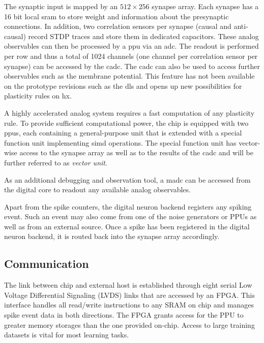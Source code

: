 The synaptic input is mapped by an $512 \times 256$ synapse array. Each synapse has a 16 bit local \gls{sram} to store weight and information about the presynaptic connections. In addition, two correlation sensors per synapse (causal and anti-causal) record STDP traces and store them in dedicated capacitors. These analog observables can then be processed by a \gls{ppu} via an \gls{adc}. The readout is performed per row and thus a total of 1024 channels (one channel per correlation sensor per synapse) can be accessed by the \gls{cadc}. The \gls{cadc} can also be used to access further observables such as the membrane potential. This feature has not been available on the prototype revisions such as the \gls{dls} and opens up new possibilities for plasticity rules on \gls{hx}.

A highly accelerated analog system requires a fast computation of any plasticity rule. To provide sufficient computational power, the chip is equipped with two \glspl{ppu}, each containing a general-purpose unit that is extended with a special function unit implementing \gls{simd} operations. The special function unit has vector-wise access to the synapse array as well as to the results of the \gls{cadc} and will be further referred to as \textit{vector unit}.

As an additional debugging and observation tool, a \gls{madc} can be accessed from the digital core to readout any available analog observables.

Apart from the spike counters, the digital neuron backend registers any spiking event. Such an event may also come from one of the noise generators or PPUs as well as from an external source. Once a spike has been registered in the digital neuron backend, it is routed back into the synapse array accordingly. 

\subsection{Communication}
The link between chip and external host is established through eight serial Low Voltage Differential Signaling (LVDS) links that are accessed by an FPGA. This interface handles all read/write instructions to any SRAM on chip and manages spike event data in both directions. The FPGA grants access for the PPU to greater memory storages than the one provided on-chip. Access to large training datasets is vital for most learning tasks.

